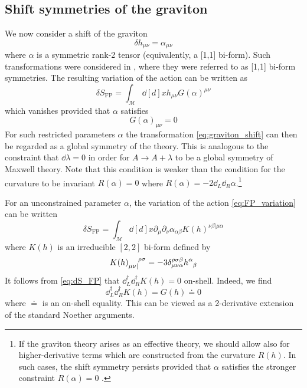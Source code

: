 \subsection{Shift symmetries of the graviton}
\label{sec:graviton_shifts}

We now consider a shift of the graviton
\begin{equation}\label{eq:graviton_shift}
    \delta h_{\mu\nu} = \alpha_{\mu\nu}
\end{equation}
where $\alpha$ is a symmetric rank-2 tensor (equivalently, a [1,1] bi-form). Such transformations were considered in \cite{Hinterbichler2023GravitySymmetries}, where they were referred to as [1,1] bi-form symmetries. 
The resulting variation of the action can be written as
\begin{equation}\label{eq:FP_variation}
    \delta S_{\text{FP}} = \int_{\mathcal{M}} \dd[d]{x} h_{\mu\nu} G(\alpha)^{\mu\nu}
\end{equation}
which vanishes provided that $\alpha$ satisfies 
\begin{equation}\label{eq:G(alpha)=0}
    G(\alpha)_{\mu\nu} = 0
\end{equation}
For such restricted parameters $\alpha$ the transformation \eqref{eq:graviton_shift} can then be regarded as  a global symmetry of the theory. This is analogous to the constraint that $\dd\lambda=0$ in order for $A\to A+\lambda$ to be a global symmetry of Maxwell theory. 
Note that this condition is weaker than the condition for the curvature to be invariant $R(\alpha) =  0$ where
$R(\alpha) = -2 \dd_L \dd_R \alpha $.\footnote{If the  graviton theory arises as an effective theory, we should allow also for higher-derivative terms which are constructed from the curvature $R(h)$. In such cases, the shift symmetry  persists provided that $\alpha$ satisfies the stronger constraint $R(\alpha)  = 0$ \cite{Hinterbichler2023GravitySymmetries}.}

For an unconstrained parameter $\alpha$, the variation of the action \eqref{eq:FP_variation} can be written
\begin{equation}\label{eq:dS_FP}
    \delta S_{\text{FP}} = \int_{\mathcal{M}} \dd[d]{x} \partial_\mu \partial_\nu \alpha_{\alpha\beta} K(h)^{\nu\beta|\mu\alpha}
\end{equation}
where $K(h)$ is an irreducible $[2,2]$ bi-form defined by
\begin{equation}
    K(h)\indices{_{\mu\nu|}^{\rho\sigma}} = -3 \delta_{\mu\nu\alpha}^{\rho\sigma\beta} h\indices{^\alpha_\beta}
\end{equation}
It follows from \eqref{eq:dS_FP} 
that $\dd_L^\dag \dd_R^\dag K(h)=0$ on-shell. Indeed, we find
\begin{equation}\label{eq:dLdRK=0}
    \dd_L^\dag \dd_R^\dag K(h) = G(h) \doteq 0
\end{equation}
where $\doteq$ is an on-shell equality. This can be viewed as a 2-derivative extension of the standard Noether arguments.

